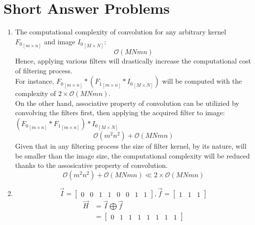 \documentclass{article}
\begin{document}
\section{Short Answer Problems}
\begin{enumerate}
	\item The computational complexity of convolution for any arbitrary
	kernel ${F_0}_{[m\times n]}$ and image ${I_0}_{[M\times N]}$:
	$$\mathcal{O}(MNmn)$$
	Hence, applying various filters will drastically increase
	the computational cost of filtering process.\\
	For instance, ${F_0}_{[m\times n]} \ast ({F_1}_{[m\times n]} \ast
	{I_0}_{[M\times N]})$ will be computed with the complexity of $2 \times
	\mathcal{O}(MNmn)$. \\
	On the other hand, associative property of convolution can be
	utilizied by convolving the filters first, then applying the acquired filter to
	image:
	$({F_0}_{[m\times n]} \ast {F_1}_{[m\times n]}) \ast
	{I_0}_{[M\times N]}$ $$\mathcal{O}(m^2n^2) + \mathcal{O}(MNmn)$$
	Given that in any filtering process the size of filter
	kernel, by its nature, will be smaller than the image size, the computational
	complexity will be reduced thanks to the assosicative property of convolution.
	$$\mathcal{O}{(m^2n^2)} + \mathcal{O}(MNmn) \ll 2 \times \mathcal{O}(MNmn)$$
	\item 
	$$\vec{I} = \begin{bmatrix} 0 & 0 & 1 & 1 & 0 & 0 & 1 & 1\end{bmatrix}
	, \vec{f}= \begin{bmatrix} 1 & 1 & 1\end{bmatrix}$$
	\begin{equation} 
	\begin{split}
	\vec{H} & = \vec{I} \bigoplus \vec{f} \\
	& = \begin{bmatrix} 0 & 1 & 1 & 1 & 1 & 1 & 1 & 1  \end{bmatrix}
	\end{split}
	\end{equation}

\end{enumerate}
\end{document}
